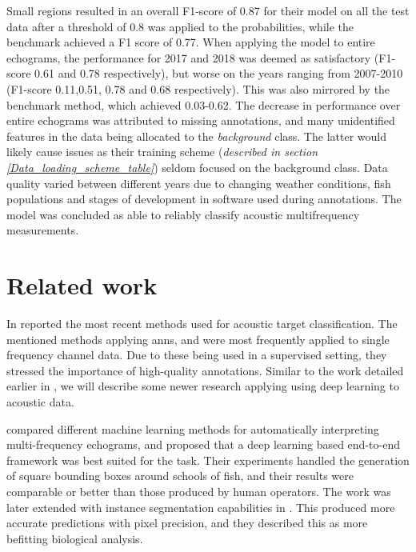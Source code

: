     Small regions resulted in an overall F1-score of 0.87 for their model on all the test data after a threshold of 0.8 was applied to the probabilities, while the benchmark achieved a F1 score of 0.77. When applying the model to entire echograms, the performance for 2017 and 2018 was deemed as satisfactory (F1-score 0.61 and 0.78 respectively), but worse on the years ranging from 2007-2010 (F1-score 0.11,0.51, 0.78 and 0.68 respectively). This was also mirrored by the benchmark method, which achieved 0.03-0.62. The decrease in performance over entire echograms was attributed to missing annotations, and many unidentified features in the data being allocated to the \textit{background} class. The latter would likely cause issues as their training scheme (\textit{described in section \ref{Data_loading_scheme_table}}) seldom focused on the background class. Data quality varied between different years due to changing weather conditions, fish populations and stages of development in software used during annotations. The model was concluded as able to reliably classify acoustic multifrequency measurements\cite{brautaset2020acoustic}.


\section{Related work} \label{related_work}
In \citeyear{korneliussen2018acoustic} \citet{korneliussen2018acoustic} reported the most recent methods used for acoustic target classification. The mentioned methods applying \gls{ann}s, and were most frequently applied to single frequency channel data. Due to these being used in a supervised setting, they stressed the importance of high-quality annotations. Similar to the work detailed earlier in \citet{brautaset2020acoustic}, we will describe some newer research applying using deep learning to acoustic data.
   
\citet{marques2021detecting} compared different machine learning methods for automatically interpreting multi-frequency echograms, and proposed that a deep learning based end-to-end framework was best suited for the task. Their experiments handled the generation of square bounding boxes around schools of fish, and their results were comparable or better than those produced by human operators. The work was later extended with instance segmentation capabilities in \citeyear{marques2021instance}\cite{marques2021instance}. This produced more accurate predictions with pixel precision, and they described this as more befitting biological analysis.
 
